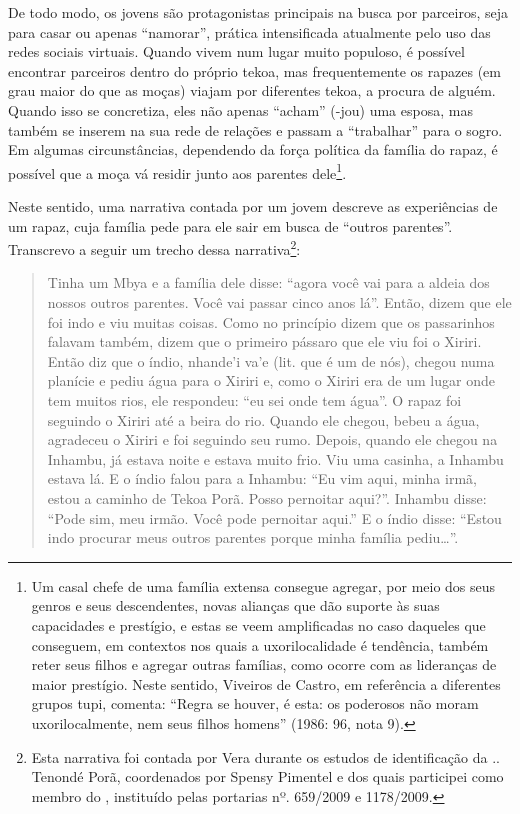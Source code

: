 De todo modo, os jovens são protagonistas principais na busca por
parceiros, seja para casar ou apenas ``namorar'', prática intensificada
atualmente pelo uso das redes sociais virtuais. Quando vivem num lugar
muito populoso, é possível encontrar parceiros dentro do próprio tekoa,
mas frequentemente os rapazes (em grau maior do que as moças) viajam
por diferentes tekoa, a procura de alguém. Quando isso se concretiza,
eles não apenas ``acham'' (-jou) uma esposa, mas também se inserem na sua
rede de relações e passam a ``trabalhar'' para o sogro. Em algumas
circunstâncias, dependendo da força política da família do rapaz, é
possível que a moça vá residir junto aos parentes dele\footnote{Um
casal chefe de uma família extensa consegue agregar, por meio dos seus
genros e seus descendentes, novas alianças que dão suporte às suas
capacidades e prestígio, e estas se veem amplificadas no caso daqueles
que conseguem, em contextos nos quais a uxorilocalidade é tendência,
também reter seus filhos e agregar outras famílias, como ocorre com as
lideranças de maior prestígio. Neste sentido, Viveiros de Castro, em
referência a diferentes grupos tupi, comenta: ``Regra se houver, é esta:
os poderosos não moram uxorilocalmente, nem seus filhos homens'' (1986:
96, nota 9).}. 

Neste sentido, uma narrativa contada por um jovem descreve as
experiências de um rapaz, cuja família pede para ele sair em busca de
``outros parentes''. Transcrevo a seguir um trecho dessa
narrativa\footnote{Esta narrativa foi contada por Vera durante os
estudos de identificação da .. Tenondé Porã, coordenados por Spensy
Pimentel e dos quais participei como membro do , instituído pelas
portarias nº. 659/2009 e 1178/2009.}: 

\begin{quotation}
Tinha um Mbya e a família dele disse: ``agora você vai para a aldeia dos
nossos outros parentes. Você vai passar cinco anos lá''. Então, dizem
que ele foi indo e viu muitas coisas. Como no princípio dizem que os
passarinhos falavam também, dizem que o primeiro pássaro que ele viu
foi o Xiriri. Então diz que o índio, nhande’i va’e (lit. que é um de
nós), chegou numa planície e pediu água para o Xiriri e, como o Xiriri
era de um lugar onde tem muitos rios, ele respondeu: ``eu sei onde tem
água''. O rapaz foi seguindo o Xiriri até a beira do rio. Quando ele
chegou, bebeu a água, agradeceu o Xiriri e foi seguindo seu rumo.
Depois, quando ele chegou na Inhambu, já estava noite e estava muito
frio. Viu uma casinha, a Inhambu estava lá. E o índio falou para a
Inhambu: ``Eu vim aqui, minha irmã, estou a caminho de Tekoa Porã. Posso
pernoitar aqui?''. Inhambu disse: ``Pode sim, meu irmão. Você pode
pernoitar aqui.'' E o índio disse: ``Estou indo procurar meus outros
parentes porque minha família pediu\ldots{}''. 
\end{quotation}

